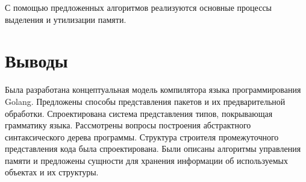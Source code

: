 С помощью предложенных алгоритмов реализуются основные процессы выделения и утилизации памяти.

\section*{Выводы}

Была разработана концептуальная модель компилятора языка программирования Golang.
Предложены способы представления пакетов и их предварительной обработки.
Спроектирована система представления типов, покрывающая грамматику языка.
Рассмотрены вопросы построения абстрактного синтаксического дерева программы.
Структура строителя промежуточного представления кода была спроектирована.
Были описаны алгоритмы управления памяти и предложены сущности для хранения информации об используемых объектах и их структуры.
